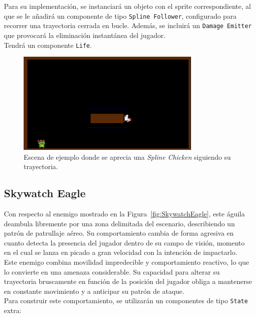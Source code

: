 Para su implementación, se instanciará un objeto con el sprite correspondiente, al que se le añadirá un componente de tipo \texttt{Spline Follower}, configurado para recorrer una trayectoria cerrada en bucle. Además, se incluirá un \texttt{Damage Emitter} que provocará la eliminación instantánea del jugador.\\

Tendrá un componente \texttt{Life}.

\begin{figure}[t]
	\centering
	\includegraphics[height=5cm]{Imagenes/Gallina_Spline.png}
	\caption{Escena de ejemplo donde se aprecia una \textit{Spline Chicken} siguiendo su trayectoria.}
	\label{fig:SplineChicken}
\end{figure}

\subsection{Skywatch Eagle}

Con respecto al enemigo mostrado en la Figura~\ref{fig:SkywatchEagle}, este águila deambula libremente por una zona delimitada del escenario, describiendo un patrón de patrullaje aéreo. Su comportamiento cambia de forma agresiva en cuanto detecta la presencia del jugador dentro de su campo de visión, momento en el cual se lanza en picado a gran velocidad con la intención de impactarlo.\\

Este enemigo combina movilidad impredecible y comportamiento reactivo, lo que lo convierte en una amenaza considerable. Su capacidad para alterar su trayectoria bruscamente en función de la posición del jugador obliga a mantenerse en constante movimiento y a anticipar su patrón de ataque.\\

Para construir este comportamiento, se utilizarán un componentes de tipo \texttt{State} extra:

